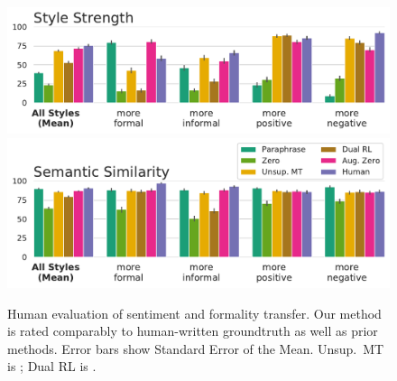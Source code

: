 \begin{figure}[tbp]
    \includegraphics[width=0.5\linewidth]{figures/style_standard_True.pdf}
    \includegraphics[width=0.5\linewidth]{figures/meaning_standard_True.pdf}
  \caption{Human evaluation of sentiment and formality transfer. Our method is rated comparably to human-written groundtruth as well as prior methods. Error bars show Standard Error of the Mean. Unsup.~MT is \citet{prabhumoye-etal-2018-style}; Dual RL is \citet{DBLP:conf/ijcai/LuoLZYCSS19}. }
  \label{human_eval_standard_style}
\end{figure}


